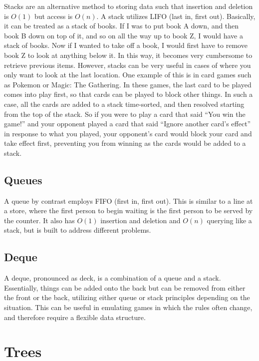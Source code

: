 Stacks are an alternative method to storing data such that insertion and deletion is $O(1)$ but access is $O(n)$. A stack utilizes LIFO (last in, first out). Basically, it can be treated as a stack of books. If I was to put book A down, and then book B down on top of it, and so on all the way up to book Z, I would have a stack of books. Now if I wanted to take off a book, I would first have to remove book Z to look at anything below it. In this way, it becomes very cumbersome to retrieve previous items. However, stacks can be very useful in cases of where you only want to look at the last location. One example of this is in card games such as Pokemon or Magic: The Gathering. In these games, the last card to be played comes into play first, so that cards can be played to block other things. In such a case, all the cards are added to a stack time-sorted, and then resolved starting from the top of the stack. So if you were to play a card that said “You win the game!” and your opponent played a card that said “Ignore another card’s effect” in response to what you played, your opponent’s card would block your card and take effect first, preventing you from winning as the cards would be added to a stack.


\subsection{Queues}

A queue by contrast employs FIFO (first in, first out). This is similar to a line at a store, where the first person to begin waiting is the first person to be served by the counter. It also has $O(1)$ insertion and deletion and $O(n)$ querying like a stack, but is built to address different problems.

\subsection{Deque}

A deque, pronounced as deck, is a combination of a queue and a stack. Essentially, things can be added onto the back but can be removed from either the front or the back, utilizing either queue or stack principles depending on the situation. This can be useful in emulating games in which the rules often change, and therefore require a flexible data structure.


\section{Trees}

